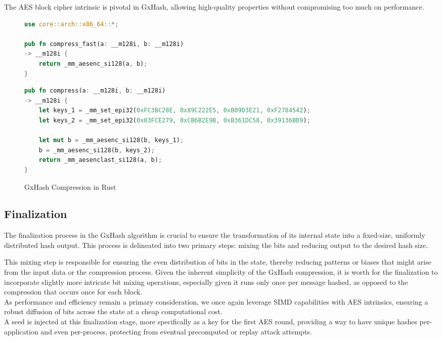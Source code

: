 \documentclass[10pt]{article}
\begin{document}
The AES block cipher intrinsic is pivotal in GxHash, allowing high-quality properties without compromising too much on performance.

\begin{figure}[H]
\begin{multicols}{2}
\begin{lstlisting}[language=Rust, style=boxed]
use core::arch::x86_64::*;

pub fn compress_fast(a: __m128i, b: __m128i)
-> __m128i {
    return _mm_aesenc_si128(a, b);
}
\end{lstlisting}
\columnbreak
\begin{lstlisting}[language=Rust, style=boxed]
pub fn compress(a: __m128i, b: __m128i)
-> __m128i {
    let keys_1 = _mm_set_epi32(0xFC3BC28E, 0x89C222E5, 0xB09D3E21, 0xF2784542);
    let keys_2 = _mm_set_epi32(0x03FCE279, 0xCB6B2E9B, 0xB361DC58, 0x39136BD9);

    let mut b = _mm_aesenc_si128(b, keys_1);
    b = _mm_aesenc_si128(b, keys_2);
    return _mm_aesenclast_si128(a, b);
}
\end{lstlisting}
\end{multicols}
\caption{GxHash Compression in Rust}
\label{fig:compression_rust_example}
\end{figure}

\subsection{Finalization}

The finalization process in the GxHash algorithm is crucial to ensure the transformation of its internal state into a fixed-size, uniformly distributed hash output. This process is delineated into two primary steps: mixing the bits and reducing output to the desired hash size.

This mixing step is responsible for ensuring the even distribution of bits in the state, thereby reducing patterns or biases that might arise from the input data or the compression process. Given the inherent simplicity of the GxHash compression, it is worth for the finalization to incorporate slightly more intricate bit mixing operations, especially given it runs only once per message hashed, as opposed to the compression that occurs once for each block.\\
As performance and efficiency remain a primary consideration, we once again leverage SIMD capabilities with AES intrinsics, ensuring a robust diffusion of bits across the state at a cheap computational cost.\\
A seed is injected at this finalization stage, more specifically as a key for the first AES round, providing a way to have unique hashes per-application and even per-process, protecting from eventual precomputed or replay attack attempts.
\end{document}
